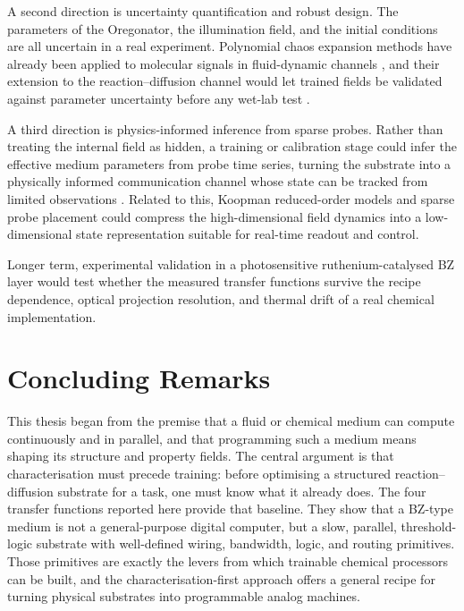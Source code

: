 A second direction is uncertainty quantification and robust design.
The parameters of the Oregonator, the illumination field, and the initial conditions are all uncertain in a real experiment.
Polynomial chaos expansion methods have already been applied to molecular signals in fluid-dynamic channels \cite{abbaszadeh2019uncertainty}, and their extension to the reaction--diffusion channel would let trained fields be validated against parameter uncertainty before any wet-lab test \cite{guo2021molecular}.

A third direction is physics-informed inference from sparse probes.
Rather than treating the internal field as hidden, a training or calibration stage could infer the effective medium parameters from probe time series, turning the substrate into a physically informed communication channel whose state can be tracked from limited observations \cite{lin2023diversity}.
Related to this, Koopman reduced-order models and sparse probe placement could compress the high-dimensional field dynamics into a low-dimensional state representation suitable for real-time readout and control.

Longer term, experimental validation in a photosensitive ruthenium-catalysed BZ layer would test whether the measured transfer functions survive the recipe dependence, optical projection resolution, and thermal drift of a real chemical implementation.

\section{Concluding Remarks}
\label{sec:conc_remarks}

This thesis began from the premise that a fluid or chemical medium can compute continuously and in parallel, and that programming such a medium means shaping its structure and property fields.
The central argument is that characterisation must precede training: before optimising a structured reaction--diffusion substrate for a task, one must know what it already does.
The four transfer functions reported here provide that baseline.
They show that a BZ-type medium is not a general-purpose digital computer, but a slow, parallel, threshold-logic substrate with well-defined wiring, bandwidth, logic, and routing primitives.
Those primitives are exactly the levers from which trainable chemical processors can be built, and the characterisation-first approach offers a general recipe for turning physical substrates into programmable analog machines.
